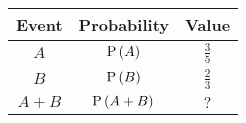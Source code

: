 \begin{tabular}{|c|c|c|} 
\hline
\textbf{Event} & \textbf{Probability} & \textbf{Value} \\
\hline
$A$ & $\text{P}\left(A\right)$ & $\frac{3}{5}$ \\
\hline
$B$ & $\text{P}\left(B\right)$ & $\frac{2}{3}$ \\
\hline
$A + B$ & $\text{P}\left(A + B\right)$ & $?$ \\
\hline
\end{tabular}